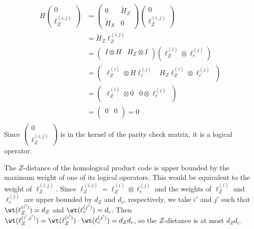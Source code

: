 \documentclass{article}
\begin{document}
\begin{align*}
    H\begin{pmatrix} 0 \\ \ell_Z^{(i, j)}\end{pmatrix} & = \begin{pmatrix}
        0 & \tilde{H}_Z \\
        \tilde{H}_X & 0
    \end{pmatrix}\begin{pmatrix} 0 \\ \ell_Z^{(i, j)}\end{pmatrix} \\
    & = \tilde{H}_Z\ell_Z^{(i, j)} \\
    & = \begin{pmatrix}
        I \otimes H & H_Z \otimes I \\
    \end{pmatrix}(\ell_Z^{(i)} \otimes \ell_c^{(j)}) \\
    & = \begin{pmatrix}
        \ell_Z^{(i)} \otimes H\ell_c^{(j)} & H_Z\ell_Z^{(i)} \otimes \ell_c^{(j)} \\
    \end{pmatrix} \\
    & = \begin{pmatrix}
        \ell_Z^{(i)} \otimes 0 & 0 \otimes \ell_c^{(j)} \\
    \end{pmatrix} \\
    & = \begin{pmatrix}
        0 & 0 \\
    \end{pmatrix} = 0 \\
\end{align*}
Since $\begin{pmatrix} 0 \\ \ell_Z^{(i, j)}\end{pmatrix}$ is in the kernel of the parity check matrix, it is a logical operator.

The $Z$-distance of the homological product code is upper bounded by the maximum weight of one of its logical operators. This would be equivalent to the weight of $\ell_Z^{(i, j)}$. Since $\ell_Z^{(i,j)} = \ell_Z^{(i)} \otimes \ell_c^{(j)}$ and the weights of $\ell_Z^{(i)}$ and $\ell_c^{(j)}$ are upper bounded by $d_Z$ and $d_c$, respectively, we take $i'$ and $j'$ such that $\wt(\ell_Z^{(i')}) = d_Z$ and $\wt(\ell_c^{(j')}) = d_c$. Then $\wt(\ell_Z^{(i', j')}) = \wt(\ell_Z^{(i')}) \cdot \wt(\ell_c^{(j')}) = d_Zd_c$, so the $Z$-distance is at most $d_Zd_c$.
\end{document}
